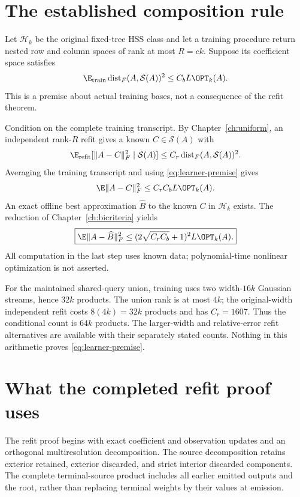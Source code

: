 \documentclass[11pt,oneside,openany,a4paper]{book}
\numberwithin{equation}{chapter}
\theoremstyle{definition}
\theoremstyle{remark}
\begin{document}
\section{The established composition rule}
Let $\mathcal H_k$ be the original fixed-tree HSS class and let a training procedure return nested row and column spaces of rank at most $R=ck$. Suppose its coefficient space satisfies
\begin{equation}\label{eq:learner-premise}
 \E_{\rm train}\operatorname{dist}_F(A,\mathcal S(A))^2
 \le C_bL\OPT_k(A).
\end{equation}
This is a premise about actual training bases, not a consequence of the refit theorem.

Condition on the complete training transcript. By Chapter~\ref{ch:uniform}, an independent rank-$R$ refit gives a known $C\in\mathcal S(A)$ with
\[
 \E_{\rm refit}[\|A-C\|_F^2\mid\mathcal S(A)]
 \le C_r\operatorname{dist}_F(A,\mathcal S(A))^2.
\]
Averaging the training transcript and using \eqref{eq:learner-premise} gives
\[
 \E\|A-C\|_F^2\le C_rC_bL\OPT_k(A).
\]
An exact offline best approximation $\widehat B$ to the known $C$ in $\mathcal H_k$ exists. The reduction of Chapter~\ref{ch:bicriteria} yields
\begin{equation}\label{eq:final}
 \boxed{\E\|A-\widehat B\|_F^2
 \le(2\sqrt{C_rC_b}+1)^2L\OPT_k(A).}
\end{equation}
All computation in the last step uses known data; polynomial-time nonlinear optimization is not asserted.

For the maintained shared-query union, training uses two width-$16k$ Gaussian streams, hence $32k$ products. The union rank is at most $4k$; the original-width independent refit costs $8(4k)=32k$ products and has $C_r=1607$. Thus the conditional count is $64k$ products. The larger-width and relative-error refit alternatives are available with their separately stated counts. Nothing in this arithmetic proves \eqref{eq:learner-premise}.

\section{What the completed refit proof uses}
The refit proof begins with exact coefficient and observation updates and an orthogonal multiresolution decomposition. The source decomposition retains exterior retained, exterior discarded, and strict interior discarded components. The complete terminal-source product includes all earlier emitted outputs and the root, rather than replacing terminal weights by their values at emission.
\end{document}
